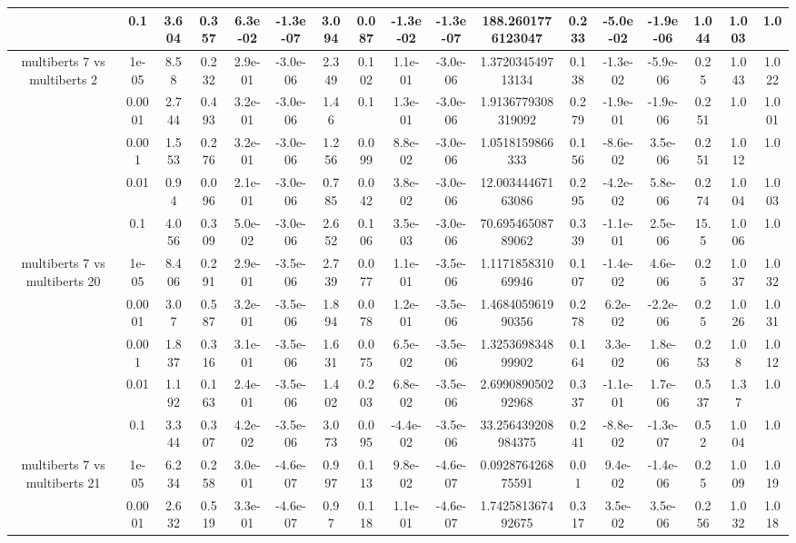 \begin{tabular}{|c|c|c|c|c|c|c|c|c|c|c|c|c|c|c|c|c|}
 & 0.1 & 3.604 & 0.357 & 6.3e-02 & -1.3e-07 & 3.094 & 0.087 & -1.3e-02 & -1.3e-07 & 188.2601776123047 & 0.233 & -5.0e-02 & -1.9e-06 & 1.044 & 1.003 & 1.0 \\
\hline
\multirow{5}{*}{multiberts 7 vs multiberts 2} & 1e-05 & 8.58 & 0.232 & 2.9e-01 & -3.0e-06 & 2.349 & 0.102 & 1.1e-01 & -3.0e-06 & 1.372034549713134 & 0.138 & -1.3e-02 & -5.9e-06 & 0.25 & 1.043 & 1.022 \\
 & 0.0001 & 2.744 & 0.493 & 3.2e-01 & -3.0e-06 & 1.46 & 0.1 & 1.3e-01 & -3.0e-06 & 1.9136779308319092 & 0.279 & -1.9e-01 & -1.9e-06 & 0.251 & 1.0 & 1.001 \\
 & 0.001 & 1.553 & 0.276 & 3.2e-01 & -3.0e-06 & 1.256 & 0.099 & 8.8e-02 & -3.0e-06 & 1.0518159866333 & 0.156 & -8.6e-02 & 3.5e-06 & 0.251 & 1.012 & 1.0 \\
 & 0.01 & 0.94 & 0.096 & 2.1e-01 & -3.0e-06 & 0.785 & 0.042 & 3.8e-02 & -3.0e-06 & 12.00344467163086 & 0.295 & -4.2e-02 & 5.8e-06 & 0.274 & 1.004 & 1.003 \\
 & 0.1 & 4.056 & 0.309 & 5.0e-02 & -3.0e-06 & 2.652 & 0.106 & 3.5e-03 & -3.0e-06 & 70.69546508789062 & 0.339 & -1.1e-01 & 2.5e-06 & 15.5 & 1.006 & 1.0 \\
\hline
\multirow{5}{*}{multiberts 7 vs multiberts 20} & 1e-05 & 8.406 & 0.291 & 2.9e-01 & -3.5e-06 & 2.739 & 0.077 & 1.1e-01 & -3.5e-06 & 1.117185831069946 & 0.107 & -1.4e-02 & 4.6e-06 & 0.25 & 1.037 & 1.032 \\
 & 0.0001 & 3.07 & 0.587 & 3.2e-01 & -3.5e-06 & 1.894 & 0.078 & 1.2e-01 & -3.5e-06 & 1.468405961990356 & 0.278 & 6.2e-02 & -2.2e-06 & 0.25 & 1.026 & 1.031 \\
 & 0.001 & 1.837 & 0.316 & 3.1e-01 & -3.5e-06 & 1.631 & 0.075 & 6.5e-02 & -3.5e-06 & 1.325369834899902 & 0.164 & 3.3e-02 & 1.8e-06 & 0.253 & 1.08 & 1.012 \\
 & 0.01 & 1.192 & 0.163 & 2.4e-01 & -3.5e-06 & 1.402 & 0.203 & 6.8e-02 & -3.5e-06 & 2.699089050292968 & 0.337 & -1.1e-01 & 1.7e-06 & 0.537 & 1.37 & 1.0 \\
 & 0.1 & 3.344 & 0.307 & 4.2e-02 & -3.5e-06 & 3.073 & 0.095 & -4.4e-02 & -3.5e-06 & 33.256439208984375 & 0.241 & -8.8e-02 & -1.3e-07 & 0.52 & 1.004 & 1.0 \\
\hline
\multirow{5}{*}{multiberts 7 vs multiberts 21} & 1e-05 & 6.234 & 0.258 & 3.0e-01 & -4.6e-07 & 0.997 & 0.113 & 9.8e-02 & -4.6e-07 & 0.092876426875591 & 0.01 & 9.4e-02 & -1.4e-06 & 0.25 & 1.009 & 1.019 \\
 & 0.0001 & 2.632 & 0.519 & 3.3e-01 & -4.6e-07 & 0.97 & 0.118 & 1.1e-01 & -4.6e-07 & 1.742581367492675 & 0.317 & 3.5e-02 & 3.5e-06 & 0.256 & 1.032 & 1.018 \\

\end{tabular}
